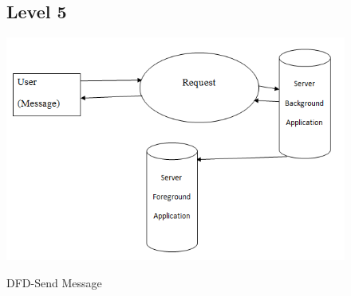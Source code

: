 \begin{figure}
\subsection{Level 5}
\label{Level 5} 
\begin{center}
\scalebox{0.70}
{\includegraphics{send1.png}}
\caption{DFD-Send Message} 
\end{center}
\end{figure}	


